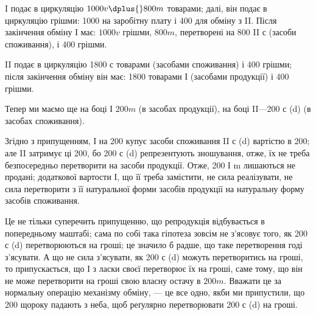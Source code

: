 \parcont{}  %
I подає в циркуляцію $1000 v \dplus{} 800 m$ товарами; далі, він подає
в циркуляцію грішми: 1000 на заробітну плату і 400
для обміну з II. Після закінчення обміну І має: $1000 v$ грішми, $800 m$,
перетворені на 800 II с (засоби споживання), і 400 грішми.

II подає в циркуляцію 1800 с товарами (засобами споживання) і
400 грішми; після закінчення обміну він має: 1800 товарами І
(засобами продукції) і 400 грішми.

Тепер ми маємо ще на боці І $200 m$ (в засобах продукції), на боці
II—200 с (d) (в засобах споживання).

Згідно з припущенням, І на 200 купує засоби споживання
II с (d) вартістю в 200; але II затримує ці 200, бо 200 с (d)
репрезентують зношування, отже, їх не треба безпосередньо перетворити
на засоби продукції. Отже, 200 І m лишаються не продані;
 додаткової вартости І, що її треба замістити, не сила реалізувати, не
сила перетворити з її натуральної форми засобів продукції на натуральну
форму засобів споживання.

Це не тільки суперечить припущенню, що репродукція відбувається
в попередньому маштабі; сама по собі така гіпотеза зовсім не з’ясовує
того, як 200 с (d) перетворюються на гроші; це значило б радше, що
таке перетворення годі з’ясувати. А що не сила з’ясувати, як 200 с (d)
можуть перетворитись на гроші, то припускається, що І з ласки своєї
перетворює їх на гроші, саме тому, що він не може перетворити на гроші
свою власну остачу в $200 m$. Вважати це за нормальну операцію механізму
обміну, — це все одно, якби ми припустили, що 200
щороку падають з неба, щоб реґулярно перетворювати 200 с (d) на гроші.

